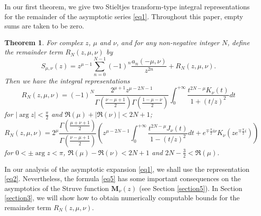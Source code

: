 \documentclass[a4paper,twoside,10pt]{amsart}
\newtheorem{theorem}{Theorem}[section]
\numberwithin{equation}{section}
\begin{document}
In our first theorem, we give two Stieltjes transform-type integral representations for the remainder of the asymptotic series \eqref{eq1}. Throughout this paper, empty sums are taken to be zero.

\begin{theorem}\label{thm1} For complex $z$, $\mu$ and $\nu$, and for any non-negative integer $N$, define the remainder term $R_N \left( {z,\mu ,\nu } \right)$ by
\begin{equation}\label{eq27}
S_{\mu ,\nu } \left( z \right) = z^{\mu  - 1} \sum\limits_{n = 0}^{N - 1} {\left( { - 1} \right)^n \frac{a_n \left( { - \mu ,\nu } \right)}{z^{2n}}}  + R_N \left( {z,\mu ,\nu } \right) .
\end{equation}
Then we have the integral representations
\begin{equation}\label{eq2}
R_N \left( {z,\mu ,\nu } \right) = \left( { - 1} \right)^N \frac{{2^{\mu  + 1} z^{\mu  - 2N - 1} }}{{\Gamma \left( {\frac{{\nu  - \mu  + 1}}{2}} \right)\Gamma \left( {\frac{{1 - \mu  - \nu }}{2}} \right)}}\int_0^{ + \infty } {\frac{{t^{2N - \mu } K_\nu  \left( t \right)}}{{1 + \left( {t/z} \right)^2 }}dt} 
\end{equation}
for $\left|\arg z\right| < \frac{\pi}{2}$ and $\Re \left( \mu  \right) + \left| {\Re \left( \nu  \right)} \right|< 2N + 1$;
\begin{equation}\label{eq5}
R_N \left( {z,\mu ,\nu } \right) = 2^\mu  \frac{{\Gamma \left( {\frac{{\mu  + \nu  + 1}}{2}} \right)}}{{\Gamma \left( {\frac{{\nu  - \mu  + 1}}{2}} \right)}}\left( {z^{\mu  - 2N - 1} \int_0^{ + \infty } {\frac{{t^{2N - \mu } J_\nu  \left( t \right)}}{{1 - \left( {t/z} \right)^2 }}dt}  + e^{ \mp \frac{\pi }{2}i\nu } K_\nu  \left( {ze^{ \mp \frac{\pi }{2}i} } \right)} \right)
\end{equation}
for $0 < \pm \arg z <\pi$, $\Re \left( \mu  \right) - \Re \left( \nu  \right)< 2N + 1$ and $2N - \frac{3}{2} < \Re \left( \mu  \right)$.
\end{theorem}

In our analysis of the asymptotic expansion \eqref{eq1}, we shall use the representation \eqref{eq2}. Nevertheless, the formula \eqref{eq5} has some important consequences on the asymptotics of the Struve function $\mathbf{M}_\nu  \left( z \right)$ (see Section \ref{section5}). In Section \ref{section3}, we will show how to obtain numerically computable bounds for the remainder term $R_N \left( {z,\mu ,\nu } \right)$.
\end{document}

